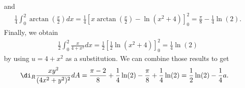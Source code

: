 \documentclass{article}
\begin{document}
and
\begin{align*}
  \frac{1}{4}\int_0^2 \arctan\left(\frac{x}{2}\right)dx
  =\frac{1}{4}\left[x\arctan\left(\frac{x}{2}\right)
  -\ln (x^2+4)\right]^2_0=
  \frac{\pi}{8}-\frac{1}{4}\ln(2).
\end{align*}
Finally, we obtain
\begin{align*}
  \frac{1}{2}\int_0^2\frac{x}{4+x^2}dx=\frac{1}{2}\left[\frac{1}{2}\ln(x^2+4)\right]_0^2=\frac{1}{4}\ln(2)
\end{align*}
by using $u=4+x^2$ as a substitution. We can combine those results
to get
\begin{align*}
  \di_R\frac{xy^2}{(4x^2+y^2)^2}dA
  &=\frac{\pi-2}{8}+\frac{1}{4}\ln(2)-\frac{\pi}{8}+\frac{1}{4}\ln(2)
  =\frac{1}{2}\ln(2)-\frac{1}{4}   a.
\end{align*}
\end{document}
